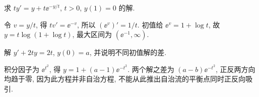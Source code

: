 \begin{exercise}求 $ty'=y+t\ee^{-y/t}$, $t>0$, $y(1)=0$ 的解.\end{exercise}
\begin{solution}令 $v=y/t$, 得 $tv'=\ee^{-v}$, 所以 $(\ee^v)'=1/t$. 初值给 $\ee^v=1+\log t$, 故 $y=t\log(1+\log t)$, 最大区间为 $(\ee^{-1},\infty)$.\end{solution}
\begin{exercise}解 $y'+2ty=2t$, $y(0)=a$, 并说明不同初值解的差.\end{exercise}
\begin{solution}积分因子为 $\ee^{t^2}$, 得 $y=1+(a-1)\ee^{-t^2}$. 两个解之差为 $(a-b)\ee^{-t^2}$, 正反两方向均趋于零, 因为此方程并非自治方程, 不能从此推出自治流的平衡点同时正反向吸引.\end{solution}
